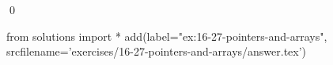
\begin{ex}
  \label{ex:16-27-pointers-and-arrays}
  
  \qed
\end{ex}
\begin{python0}
from solutions import *
add(label="ex:16-27-pointers-and-arrays",
    srcfilename='exercises/16-27-pointers-and-arrays/answer.tex')
\end{python0}

